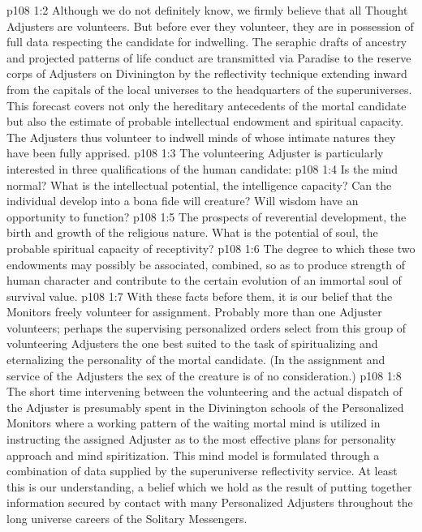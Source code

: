\vs p108 1:2 Although we do not definitely know, we firmly believe that all Thought Adjusters are volunteers. But before ever they volunteer, they are in possession of full data respecting the candidate for indwelling. The seraphic drafts of ancestry and projected patterns of life conduct are transmitted via Paradise to the reserve corps of Adjusters on Divinington by the reflectivity technique extending inward from the capitals of the local universes to the headquarters of the superuniverses. This forecast covers not only the hereditary antecedents of the mortal candidate but also the estimate of probable intellectual endowment and spiritual capacity. The Adjusters thus volunteer to indwell minds of whose intimate natures they have been fully apprised.
\vs p108 1:3 The volunteering Adjuster is particularly interested in three qualifications of the human candidate:
\vs p108 1:4 \bibnobreakspace {} Is the mind normal? What is the intellectual potential, the intelligence capacity? Can the individual develop into a bona fide will creature? Will wisdom have an opportunity to function?
\vs p108 1:5 \bibnobreakspace {} The prospects of reverential development, the birth and growth of the religious nature. What is the potential of soul, the probable spiritual capacity of receptivity?
\vs p108 1:6 \bibnobreakspace {} The degree to which these two endowments may possibly be associated, combined, so as to produce strength of human character and contribute to the certain evolution of an immortal soul of survival value.
\vs p108 1:7 \pc With these facts before them, it is our belief that the Monitors freely volunteer for assignment. Probably more than one Adjuster volunteers; perhaps the supervising personalized orders select from this group of volunteering Adjusters the one best suited to the task of spiritualizing and eternalizing the personality of the mortal candidate. (In the assignment and service of the Adjusters the sex of the creature is of no consideration.)
\vs p108 1:8 The short time intervening between the volunteering and the actual dispatch of the Adjuster is presumably spent in the Divinington schools of the Personalized Monitors where a working pattern of the waiting mortal mind is utilized in instructing the assigned Adjuster as to the most effective plans for personality approach and mind spiritization. This mind model is formulated through a combination of data supplied by the superuniverse reflectivity service. At least this is our understanding, a belief which we hold as the result of putting together information secured by contact with many Personalized Adjusters throughout the long universe careers of the Solitary Messengers.
